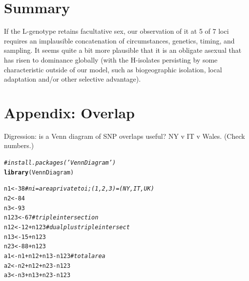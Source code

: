 \documentclass{article}\usepackage[]{graphicx}\usepackage[]{color}
\makeatletter
\newcommand{\hlnum}[1]{\textcolor[rgb]{0.686,0.059,0.569}{#1}}%
\newcommand{\hlcom}[1]{\textcolor[rgb]{0.678,0.584,0.686}{\textit{#1}}}%
\newcommand{\hlopt}[1]{\textcolor[rgb]{0,0,0}{#1}}%
\newcommand{\hlstd}[1]{\textcolor[rgb]{0.345,0.345,0.345}{#1}}%
\newcommand{\hlkwb}[1]{\textcolor[rgb]{0.69,0.353,0.396}{#1}}%
\newcommand{\hlkwd}[1]{\textcolor[rgb]{0.737,0.353,0.396}{\textbf{#1}}}%
\newenvironment{kframe}{%
 \def\at@end@of@kframe{}%
 \ifinner\ifhmode%
  \def\at@end@of@kframe{\end{minipage}}%
  \begin{minipage}{\columnwidth}%
 \fi\fi%
 \def\FrameCommand##1{\hskip\@totalleftmargin \hskip-\fboxsep
 \colorbox{shadecolor}{##1}\hskip-\fboxsep
     \hskip-\linewidth \hskip-\@totalleftmargin \hskip\columnwidth}%
 \MakeFramed {\advance\hsize-\width
   \@totalleftmargin\z@ \linewidth\hsize
   \@setminipage}}%
 {\par\unskip\endMakeFramed%
 \at@end@of@kframe}
\newenvironment{knitrout}{}{} %
\makeatother
\begin{document}
\section{Summary}
\label{sec:summary}

If the L-genotype retains facultative sex, our observation of it at 5 of 7 loci requires an
implausible concatenation of circumstances, genetics, timing, and sampling.  It seems quite a bit
more plausible that it is an obligate asexual that has risen to dominance globally (with the
H-isolates persisting by some characteristic outside of our model, such as biogeographic isolation,
local adaptation and/or other selective advantage).

\appendix

\section{Appendix: Overlap}

Digression: is a Venn diagram of SNP overlaps useful?  NY v IT v Wales.  (Check numbers.)

\begin{knitrout}\footnotesize
{}\color{fgcolor}\begin{kframe}
\begin{alltt}
\hlcom{#install.packages('VennDiagram')}
\hlkwd{library}\hlstd{(VennDiagram)}
\end{alltt}
\end{kframe}
\end{knitrout}

\begin{knitrout}\footnotesize
{}\color{fgcolor}\begin{kframe}
\begin{alltt}
\hlstd{n1}   \hlkwb{<-} \hlnum{38}        \hlcom{# ni = area private to i; (1,2,3)=(NY,IT,UK)}
\hlstd{n2}   \hlkwb{<-} \hlnum{84}
\hlstd{n3}   \hlkwb{<-} \hlnum{93}
\hlstd{n123} \hlkwb{<-} \hlnum{67}        \hlcom{# triple intersection}
\hlstd{n12}  \hlkwb{<-} \hlnum{12} \hlopt{+} \hlstd{n123} \hlcom{# dual plus triple intersect}
\hlstd{n13}  \hlkwb{<-} \hlnum{15} \hlopt{+} \hlstd{n123}
\hlstd{n23}  \hlkwb{<-} \hlnum{88} \hlopt{+} \hlstd{n123}
\hlstd{a1} \hlkwb{<-} \hlstd{n1} \hlopt{+} \hlstd{n12} \hlopt{+} \hlstd{n13} \hlopt{-} \hlstd{n123} \hlcom{# total area}
\hlstd{a2} \hlkwb{<-} \hlstd{n2} \hlopt{+} \hlstd{n12} \hlopt{+} \hlstd{n23} \hlopt{-} \hlstd{n123}
\hlstd{a3} \hlkwb{<-} \hlstd{n3} \hlopt{+} \hlstd{n13} \hlopt{+} \hlstd{n23} \hlopt{-} \hlstd{n123}
\end{alltt}
\end{kframe}
\end{knitrout}
\end{document}
